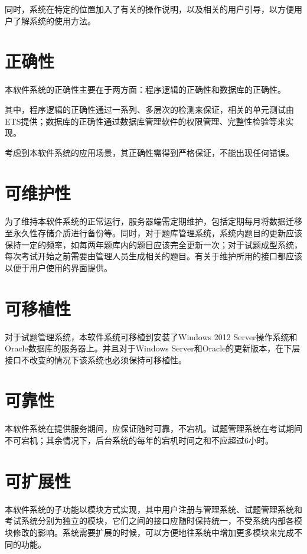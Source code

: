 同时，系统在特定的位置加入了有关的操作说明，以及相关的用户引导，以方便用户了解系统的使用方法。

\section{正确性}
本软件系统的正确性主要在于两方面：程序逻辑的正确性和数据库的正确性。

其中，程序逻辑的正确性通过一系列、多层次的检测来保证，相关的单元测试由ETS提供；数据库的正确性通过数据库管理软件的权限管理、完整性检验等来实现。

考虑到本软件系统的应用场景，其正确性需得到严格保证，不能出现任何错误。

\section{可维护性}
为了维持本软件系统的正常运行，服务器端需定期维护，包括定期每月将数据迁移至永久性存储介质进行备份等。同时，对于题库管理系统，系统内题目的更新应该保持一定的频率，如每两年题库内的题目应该完全更新一次；对于试题成型系统，每次考试开始之前需要由管理人员生成相关的题目。有关于维护所用的接口都应该以便于用户使用的界面提供。

\section{可移植性}
对于试题管理系统，本软件系统可移植到安装了Windows 2012 Server操作系统和Oracle数据库的服务器上。并且对于Windows Server和Oracle的更新版本，在下层接口不改变的情况下该系统也必须保持可移植性。

\section{可靠性}
本软件系统在提供服务期间，应保证随时可靠，不宕机。试题管理系统在考试期间不可宕机；其余情况下，后台系统的每年的宕机时间之和不应超过6小时。

\section{可扩展性}
本软件系统的子功能以模块方式实现，其中用户注册与管理系统、试题管理系统和考试系统分别为独立的模块，它们之间的接口应随时保持统一，不受系统内部各模块修改的影响。系统需要扩展的时候，可以方便地往系统中增加更多模块来完成不同的功能。